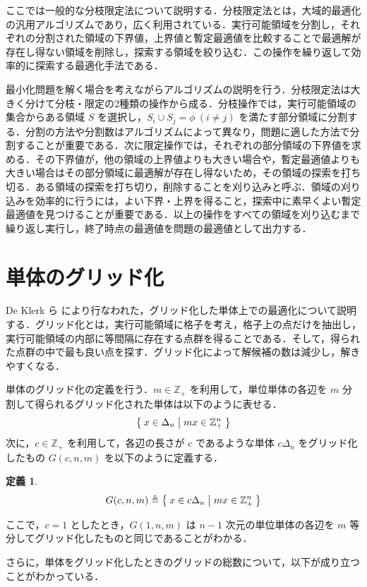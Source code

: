 \documentclass[a4paper,11pt]{jreport}
\newtheorem{definition}{定義}
\begin{document}
ここでは一般的な分枝限定法について説明する．分枝限定法とは，大域的最適化の汎用アルゴリズムであり，広く利用されている．実行可能領域を分割し，それぞれの分割された領域の下界値，上界値と暫定最適値を比較することで最適解が存在し得ない領域を削除し，探索する領域を絞り込む．この操作を繰り返して効率的に探索する最適化手法である．\par
最小化問題を解く場合を考えながらアルゴリズムの説明を行う．分枝限定法は大きく分けて分枝・限定の2種類の操作から成る．分枝操作では，実行可能領域の集合からある領域 $ S $ を選択し，$ S_i \cup S_j = \phi \: (i \neq j) $ を満たす部分領域に分割する．分割の方法や分割数はアルゴリズムによって異なり，問題に適した方法で分割することが重要である．次に限定操作では，それぞれの部分領域の下界値を求める．その下界値が，他の領域の上界値よりも大きい場合や，暫定最適値よりも大きい場合はその部分領域に最適解が存在し得ないため，その領域の探索を打ち切る．ある領域の探索を打ち切り，削除することを刈り込みと呼ぶ．領域の刈り込みを効率的に行うには，よい下界・上界を得ること，探索中に素早くよい暫定最適値を見つけることが重要である．以上の操作をすべての領域を刈り込むまで繰り返し実行し，終了時点の最適値を問題の最適値として出力する．\par

\section{単体のグリッド化}

De Klerk ら \cite{deklerk} により行なわれた，グリッド化した単体上での最適化について説明する．グリッド化とは，実行可能領域に格子を考え，格子上の点だけを抽出し，実行可能領域の内部に等間隔に存在する点群を得ることである．そして，得られた点群の中で最も良い点を探す．グリッド化によって解候補の数は減少し，解きやすくなる．\par
単体のグリッド化の定義を行う．$ m \in \mathbb{Z}_+ $ を利用して，単位単体の各辺を $ m $ 分割して得られるグリッド化された単体は以下のように表せる．
$$ \Set{ x \in \Delta_n | mx \in \mathbb{Z}_+^n } $$
次に，$ c \in \mathbb{Z}_+ $ を利用して，各辺の長さが $ c $ であるような単体 $ c \Delta_n $ をグリッド化したもの $ G(c, n, m) $ を以下のように定義する．

\begin{definition}
$$ G(c, n, m) \triangleq \Set{x \in c \Delta_n | mx \in \mathbb{Z}_+^n} $$
\end{definition}

ここで，$ c = 1 $ としたとき，$ G(1, n, m) $ は $ n - 1 $ 次元の単位単体の各辺を $ m $ 等分してグリッド化したものと同じであることがわかる．\par
さらに，単体をグリッド化したときのグリッドの総数について，以下が成り立つことがわかっている．
\end{document}
